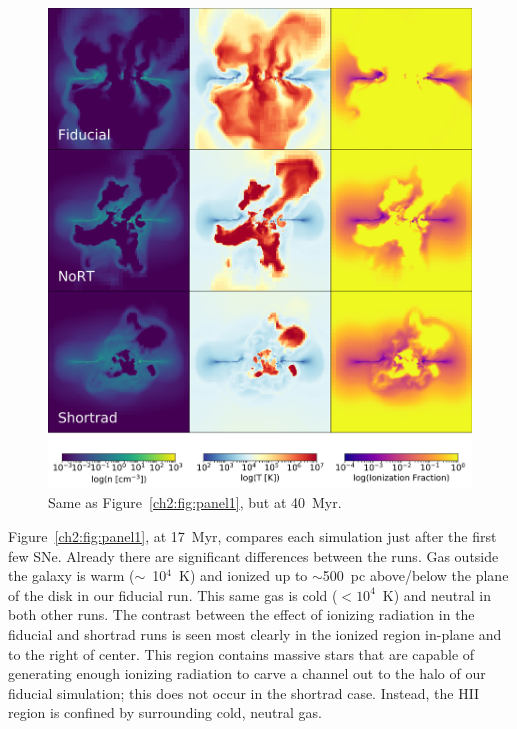 \begin{figure}
\centering
\includegraphics[width=0.99\linewidth]{figures/ch2/DD0160_fiducial_shortrad_nort}
\caption{Same as Figure~\ref{ch2:fig:panel1}, but at 40~Myr.}
\label{ch2:fig:panel2}
\end{figure}

Figure~\ref{ch2:fig:panel1}, at 17~Myr, compares each simulation just after the first few SNe. Already there are significant differences between the runs. Gas outside the galaxy is warm ($\sim$~10$^{4}$~K) and ionized up to $\sim$500~pc above/below the plane of the disk in our fiducial run. This same gas is cold ($<10^4$~K) and neutral in both other runs. The contrast between the effect of ionizing radiation in the fiducial and shortrad runs is seen most clearly in the ionized region in-plane and to the right of center. This region contains massive stars that are capable of generating enough ionizing radiation to carve a channel out to the halo of our fiducial simulation; this does not occur in the shortrad case. Instead, the HII region is confined by surrounding cold, neutral gas.

